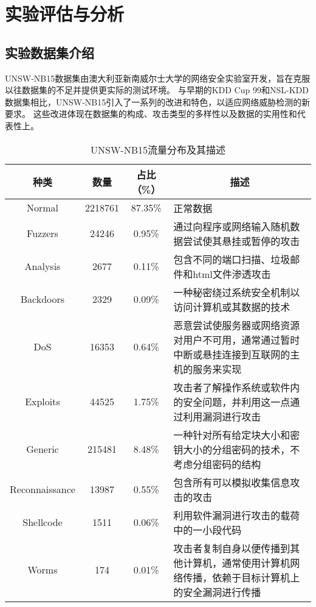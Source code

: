 \section{实验评估与分析}
\subsection{实验数据集介绍}
UNSW-NB15数据集\cite{moustafa2015comprehensive}由澳大利亚新南威尔士大学的网络安全实验室开发，旨在克服以往数据集的不足并提供更实际的测试环境。
与早期的KDD Cup 99和NSL-KDD数据集相比，UNSW-NB15引入了一系列的改进和特色，以适应网络威胁检测的新要求。
这些改进体现在数据集的构成、攻击类型的多样性以及数据的实用性和代表性上。

\begin{table}[htbp]
  \caption{UNSW-NB15流量分布及其描述}
  \label{tab:UNSW-NB15_distribution}
  \begin{tabularx}{\textwidth}{@{}cccX@{}}
    \toprule
      \multicolumn{1}{c}{\textbf{种类}} & \multicolumn{1}{c}{\textbf{数量}} & \multicolumn{1}{c}{\textbf{占比（\%）}} & \multicolumn{1}{c}{\textbf{描述}}\\
    \midrule
  Normal & 2218761 & 87.35\% & 正常数据 \\

  Fuzzers & 24246 & 0.95\% & 通过向程序或网络输入随机数据尝试使其悬挂或暂停的攻击 \\

  Analysis & 2677 & 0.11\% & 包含不同的端口扫描、垃圾邮件和html文件渗透攻击 \\

  Backdoors & 2329 & 0.09\% & 一种秘密绕过系统安全机制以访问计算机或其数据的技术 \\

  DoS & 16353 & 0.64\% & 恶意尝试使服务器或网络资源对用户不可用，通常通过暂时中断或悬挂连接到互联网的主机的服务来实现 \\

  Exploits & 44525 & 1.75\% & 攻击者了解操作系统或软件内的安全问题，并利用这一点通过利用漏洞进行攻击 \\

  Generic & 215481 & 8.48\% & 一种针对所有给定块大小和密钥大小的分组密码的技术，不考虑分组密码的结构 \\

  Reconnaissance & 13987 & 0.55\% & 包含所有可以模拟收集信息攻击的攻击 \\

  Shellcode & 1511 & 0.06\% & 利用软件漏洞进行攻击的载荷中的一小段代码 \\

  Worms & 174 & 0.01\% & 攻击者复制自身以便传播到其他计算机，通常使用计算机网络传播，依赖于目标计算机上的安全漏洞进行传播 \\
  \bottomrule
  \end{tabularx}
  \end{table}

